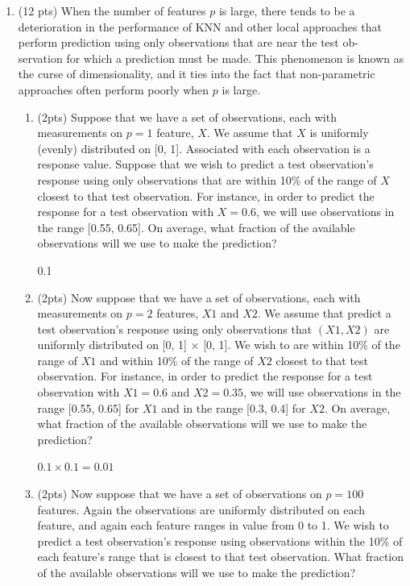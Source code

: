 \documentclass[a4paper]{article}
\theoremstyle{definition}
\newenvironment{soln}{
    \leavevmode\color{blue}\ignorespaces
}{}
\begin{document}
\begin{enumerate}
\begin{enumerate}
	      \end{enumerate}

	\item (12 pts) When the number of features $p$ is large, there tends to be a deterioration in the performance of KNN and other local approaches that perform prediction using only observations that are near the test ob- servation for which a prediction must be made. This phenomenon is known as the curse of dimensionality, and it ties into the fact that non-parametric approaches often perform poorly when $p$ is large.

	      \begin{enumerate}
		      \item (2pts) Suppose that we have a set of observations, each with measurements on $p=1$ feature, $X$. We assume that $X$ is uniformly (evenly) distributed on [0, 1]. Associated with each observation is a response value. Suppose that we wish to predict a test observation’s response using only observations that are within 10\% of the range of $X$ closest to that test observation. For instance, in order to predict the response for a test observation with $X=0.6$, we will use observations in the range [0.55, 0.65]. On average, what fraction of the available observations will we use to make the prediction?

		            \begin{soln}
			            0.1
		            \end{soln}


		      \item (2pts) Now suppose that we have a set of observations, each with measurements on $p =2$ features, $X1$ and $X2$. We assume that predict a test observation’s response using only observations that $(X1,X2)$ are uniformly distributed on [0, 1] × [0, 1]. We wish to are within 10\% of the range of $X1$ and within 10\% of the range of $X2$ closest to that test observation. For instance, in order to predict the response for a test observation with $X1 =0.6$ and $X2 =0.35$, we will use observations in the range [0.55, 0.65] for $X1$ and in the range [0.3, 0.4] for $X2$. On average, what fraction of the available observations will we use to make the prediction?

		            \begin{soln}
			            $0.1 \times 0.1 = 0.01$
		            \end{soln}

		      \item (2pts) Now suppose that we have a set of observations on $p = 100$ features. Again the observations are uniformly distributed on each feature, and again each feature ranges in value from 0 to 1. We wish to predict a test observation’s response using observations within the 10\% of each feature’s range that is closest to that test observation. What fraction of the available observations will we use to make the prediction?


\end{enumerate}
\end{enumerate}
\end{document}
